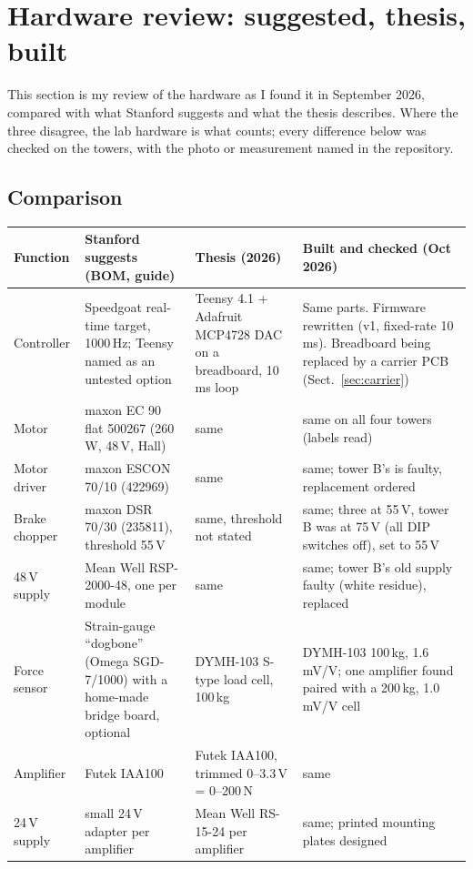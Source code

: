 \section{Hardware review: suggested, thesis, built}\label{sec:review}

This section is my review of the hardware as I found it in September 2026, compared with what Stanford
suggests and what the thesis describes. Where the three disagree, the lab hardware is what counts; every
difference below was checked on the towers, with the photo or measurement named in the repository.

\subsection{Comparison}

{\small
\begin{longtable}{>{\raggedright}p{2.6cm} >{\raggedright}p{3.9cm} >{\raggedright}p{3.6cm} >{\raggedright\arraybackslash}p{4.6cm}}
\toprule
Function & Stanford suggests (BOM, guide) & Thesis (2026) & Built and checked (Oct 2026) \\
\midrule\endhead
\bottomrule\endfoot
Controller & Speedgoat real-time target, 1000\,Hz; Teensy named as an untested option & Teensy 4.1 + Adafruit MCP4728 DAC on a breadboard, 10\,ms loop & Same parts. Firmware rewritten (v1, fixed-rate 10\,ms). Breadboard being replaced by a carrier PCB (Sect.~\ref{sec:carrier}) \\
Motor & maxon EC 90 flat 500267 (260\,W, 48\,V, Hall) & same & same on all four towers (labels read) \\
Motor driver & maxon ESCON 70/10 (422969) & same & same; tower B's is faulty, replacement ordered \\
Brake chopper & maxon DSR 70/30 (235811), threshold 55\,V & same, threshold not stated & same; three at 55\,V, tower B was at 75\,V (all DIP switches off), set to 55\,V \\
48\,V supply & Mean Well RSP-2000-48, one per module & same & same; tower B's old supply faulty (white residue), replaced \\
Force sensor & Strain-gauge ``dogbone'' (Omega SGD-7/1000) with a home-made bridge board, optional & DYMH-103 S-type load cell, 100\,kg & DYMH-103 100\,kg, 1.6\,mV/V; one amplifier found paired with a 200\,kg, 1.0\,mV/V cell \\
Amplifier & Futek IAA100 & Futek IAA100, trimmed 0--3.3\,V = 0--200\,N & same \\
24\,V supply & small 24\,V adapter per amplifier & Mean Well RS-15-24 per amplifier & same; printed mounting plates designed \\

\end{longtable}}
